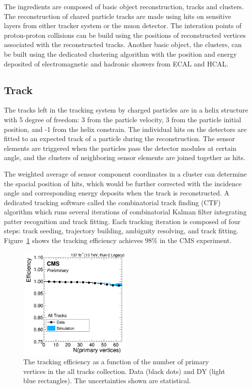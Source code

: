 The ingredients are composed of basic object reconstruction, tracks and clusters.
The reconstruction of chared particle tracks are made using hits on sensitive layers from either tracker system or the muon detector.
The interation points of proton-proton collisions can be build using the positions of reconstructed vertices associated with the reconstructed tracks.
Another basic object, the clusters, can be built using the dedicated clustering algorithm with the position and energy deposited of electromagnetic and hadronic showers from ECAL and HCAL.
\subsection{Track}
The tracks left in the tracking system by charged particles are in a helix structure with 5 degree of freedom: 3 from the particle velocity, 3 from the particle initial position, and -1 from the helix constrain.
The individual hits on the detectors are fitted to an expected track of a particle during the reconstruction.
The sensor elements are triggered when the particles pass the detector modules at certain angle, and the clusters of neighboring sensor elements are joined together as hits.

The weighted average of sensor component coordinates in a cluster can determine the spacial position of hits, which would be further corrected with the incidence angle and corresponding energy deposits when the track is reconstructed.
A dedicated tracking software called the combinatorial track finding (CTF) algorithm which runs several iterations of combinatorial Kalman filter integrating patter recognition and track fitting.
Each tracking iteration is composed of four steps: track seeding, trajectory building, ambiguity resolving, and track fitting.
Figure~\ref{fig:reco_track} shows the tracking efficiency achieves $98\%$ in the CMS experiment.

\begin{figure}\centering
    \includegraphics[width=0.5\textwidth]{figure/reco_track.png}
    \caption[The tracking efficiency as a function of the number of primary vertices in the all tracks collection.]
    {
        The tracking efficiency as a function of the number of primary vertices in the all tracks collection. 
        Data (black dots) and \MADGRAPH DY (light blue rectangles). 
        The uncertainties shown are statistical.
    }
    \label{fig:reco_track}
\end{figure}


